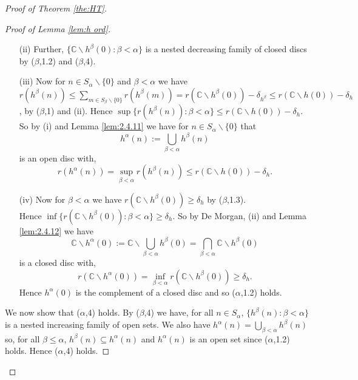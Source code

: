 \documentclass{strippedproc-l}
\theoremstyle{definition}
\theoremstyle{remark}
\numberwithin{equation}{section}
\begin{document}
\begin{proof}[Proof of Theorem \ref{the:HT}]
\begin{proof}[Proof of Lemma \ref{lem:h ord}]
\begin{enumerate}
Now for all $n\in S_{\alpha}\backslash\{0\}$, $\{h^{\beta}(n):\beta<\alpha\}$ is a nested increasing family of open discs by ($\beta$,1.2) and ($\beta$,4).
\item[\textup{(ii)}]
Further, $\{\mathbb{C}\backslash h^{\beta}(0):\beta<\alpha\}$ is a nested decreasing family of closed discs by ($\beta$,1.2) and ($\beta$,4).
\item[\textup{(iii)}]
Now for $n\in S_{\alpha}\backslash\{0\}$ and $\beta<\alpha$ we have\\ $r(h^{\beta}(n))\le\sum_{m\in S_{\beta}\backslash\{0\}}r(h^{\beta}(m))=r(\mathbb{C}\backslash h^{\beta}(0))-\delta_{h^{\beta}}\le r(\mathbb{C}\backslash h(0))-\delta_{h}$, by ($\beta$,1) and (ii). Hence $\sup\{r(h^{\beta}(n)):\beta<\alpha\}\le r(\mathbb{C}\backslash h(0))-\delta_{h}$.
So by (i) and Lemma \ref{lem:2.4.11} we have for $n\in S_{\alpha}\backslash\{0\}$ that 
\begin{equation*}
h^{\alpha}(n):=\bigcup_{\beta<\alpha}h^{\beta}(n) 
\end{equation*}
is an open disc with, 
\begin{equation*}
r(h^{\alpha}(n))=\sup_{\beta<\alpha}r(h^{\beta}(n))\le r(\mathbb{C}\backslash h(0))-\delta_{h}.
\end{equation*}
\item[\textup{(iv)}]
Now for $\beta<\alpha$ we have $r(\mathbb{C}\backslash h^{\beta}(0))\ge\delta_{h}$ by ($\beta$,1.3).\\
Hence $\inf\{r(\mathbb{C}\backslash h^{\beta}(0)):\beta<\alpha\}\ge\delta_{h}$. So by De Morgan, (ii) and Lemma \ref{lem:2.4.12} we have 
\begin{equation*}
\mathbb{C}\backslash h^{\alpha}(0):=\mathbb{C}\backslash\bigcup_{\beta<\alpha}h^{\beta}(0)=\bigcap_{\beta<\alpha}\mathbb{C}\backslash h^{\beta}(0) 
\end{equation*}
is a closed disc with, 
\begin{equation*}
r(\mathbb{C}\backslash h^{\alpha}(0))=\inf_{\beta<\alpha}r(\mathbb{C}\backslash h^{\beta}(0))\ge\delta_{h}. 
\end{equation*}
Hence $h^{\alpha}(0)$ is the complement of a closed disc and so ($\alpha$,1.2) holds.
\end{enumerate}
We now show that ($\alpha$,4) holds. By ($\beta$,4) we have, for all $n\in S_{\alpha}$, $\{h^{\beta}(n):\beta<\alpha\}$ is a nested increasing family of open sets. We also have $h^{\alpha}(n)=\bigcup_{\beta<\alpha}h^{\beta}(n)$ so, for all $\beta\le\alpha$, $h^{\beta}(n)\subseteq h^{\alpha}(n)$ and $h^{\alpha}(n)$ is an open set since ($\alpha$,1.2) holds. Hence ($\alpha$,4) holds. 

\end{proof}
\end{proof}
\end{document}
